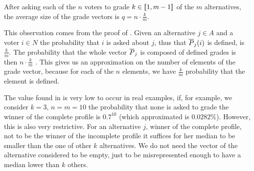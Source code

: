 	\begin{remark}
		\label{rm:sizeGV}
		After asking each of the $n$ voters to grade $k\in \llbracket1,m-1\rrbracket$ of the $m$ alternatives, the average size of the grade vectors is $q = n \cdot \frac{k}{m}$.
	\end{remark}
	This observation comes from the proof of . Given an alternative $j\in A$ and a voter $i\in N$ the probability that $i$ is asked about $j$, thus that $\overline{P}_{j}(i)$ is defined, is $\frac{k}{m}$. The probability that the whole vector $\overline{P}_{j}$ is composed of defined grades is then $n \cdot \frac{k}{m}$ . This gives us an approximation on the number of elements of the grade vector, because for each of the $n$ elements, we have $\frac{k}{m}$ probability that the element is defined.
	
	The value found in  is very low to occur in real examples, if, for example, we consider $k=3$, $n=m=10$ the probability that none is asked to grade the winner of the complete profile is $0.7^{10}$ (which approximated is $0.0282\%$).
	However, this is also very restrictive. For an alternative $j$, winner of the complete profile, not to be the winner of the incomplete profile it suffices for her median to be smaller than the one of other $k$ alternatives. 
	We do not need the vector of the alternative considered to be empty, just to be misrepresented enough to have a median lower than $k$ others.
	
